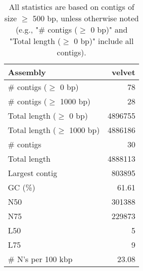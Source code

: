 \documentclass[12pt,a4paper]{article}
\begin{document}
\begin{table}[ht]
\begin{center}
\caption{All statistics are based on contigs of size $\geq$ 500 bp, unless otherwise noted (e.g., "\# contigs ($\geq$ 0 bp)" and "Total length ($\geq$ 0 bp)" include all contigs).}
\begin{tabular}{|l*{1}{|r}|}
\hline
Assembly & velvet \\ \hline
\# contigs ($\geq$ 0 bp) & 78 \\ \hline
\# contigs ($\geq$ 1000 bp) & 28 \\ \hline
Total length ($\geq$ 0 bp) & 4896755 \\ \hline
Total length ($\geq$ 1000 bp) & 4886186 \\ \hline
\# contigs & 30 \\ \hline
Total length & 4888113 \\ \hline
Largest contig & 803895 \\ \hline
GC (\%) & 61.61 \\ \hline
N50 & 301388 \\ \hline
N75 & 229873 \\ \hline
L50 & 5 \\ \hline
L75 & 9 \\ \hline
\# N's per 100 kbp & 23.08 \\ \hline
\end{tabular}
\end{center}
\end{table}
\end{document}
